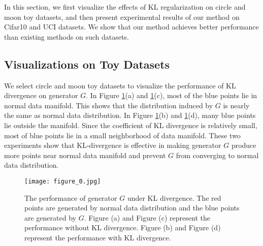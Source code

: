 \documentclass[a4paper,conference]{IEEEtran}
\begin{document}
In this section, we first visualize the effects of KL regularization on circle and moon toy datasets, and then present experimental results of our  method on Cifar10 and UCI datasets. We show that our method achieves better performance than existing methods on such datasets.

\subsection{Visualizations on Toy Datasets}
We select circle and moon toy datasets to visualize the performance of KL divergence on generator $G$.  In Figure \ref{visualize}(a) and \ref{visualize}(c), most of the blue points lie in normal data manifold. This shows that the distribution induced by $G$ is nearly the same as normal data distribution.   In Figure \ref{visualize}(b) and \ref{visualize}(d), many blue points lie outside the manifold. Since the coefficient of KL divergence is relatively small, most of blue points lie in a small neighborhood of data manifold. These two experiments show that KL-divergence is effective in making generator $G$ produce more points near normal data manifold and prevent $G$ from converging to normal data distribution.
%
\begin{figure}[h]
\center
\texttt{[image: figure\_0.jpg]}
\setlength{\belowcaptionskip}{-0.3cm}
\caption{\label{visualize}The performance of generator $G$ under KL divergence. The red points  are generated by  normal data distribution and the blue points are generated by $G$. Figure (a) and Figure (c) represent the performance without KL divergence. Figure (b) and Figure (d) represent the performance with KL divergence.}
\end{figure}
\end{document}
